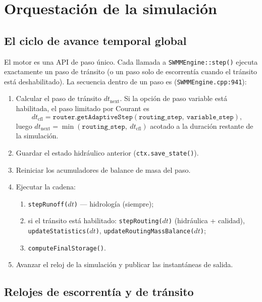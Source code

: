 \documentclass[11pt,a4paper]{article}
\begin{document}
\section{Orquestación de la simulación}

\subsection{El ciclo de avance temporal global}

El motor es una API de paso único. Cada llamada a \texttt{SWMMEngine::step()}
ejecuta exactamente un paso de tránsito (o un paso solo de escorrentía cuando
el tránsito está deshabilitado). La secuencia dentro de un paso es
(\texttt{SWMMEngine.cpp:941}):
\begin{enumerate}[nosep]
  \item Calcular el paso de tránsito $dt_{\mathrm{next}}$. Si la opción de paso
        variable está habilitada, el paso limitado por Courant es
        \[
          dt_{\mathrm{cfl}} = \texttt{router.getAdaptiveStep}(
            \texttt{routing\_step},\ \texttt{variable\_step}),
        \]
        luego $dt_{\mathrm{next}} = \min(\texttt{routing\_step},\ dt_{\mathrm{cfl}})$
        acotado a la duración restante de la simulación.
  \item Guardar el estado hidráulico anterior (\texttt{ctx.save\_state()}).
  \item Reiniciar los acumuladores de balance de masa del paso.
  \item Ejecutar la cadena:
        \begin{enumerate}[nosep]
          \item \texttt{stepRunoff($dt$)} --- hidrología (siempre);
          \item si el tránsito está habilitado: \texttt{step\-Routing($dt$)}
                (hidráulica + calidad), \texttt{update\-Statistics($dt$)},
                \texttt{update\-Routing\-Mass\-Balance($dt$)};
          \item \texttt{compute\-Final\-Storage()}.
        \end{enumerate}
  \item Avanzar el reloj de la simulación y publicar las instantáneas de
        salida.
\end{enumerate}

\subsection{Relojes de escorrentía y de tránsito}
\end{document}

